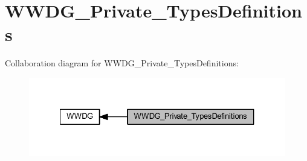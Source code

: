 \hypertarget{group___w_w_d_g___private___types_definitions}{}\section{W\+W\+D\+G\+\_\+\+Private\+\_\+\+Types\+Definitions}
\label{group___w_w_d_g___private___types_definitions}
Collaboration diagram for W\+W\+D\+G\+\_\+\+Private\+\_\+\+Types\+Definitions\+:
\nopagebreak
\begin{figure}[H]
\begin{center}
\leavevmode
\includegraphics[width=327pt]{group___w_w_d_g___private___types_definitions}
\end{center}
\end{figure}
